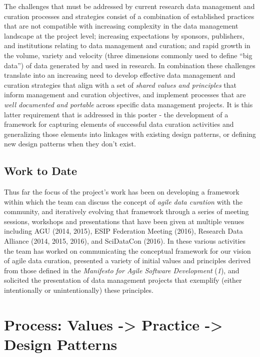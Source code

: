 \documentclass[final]{beamer}
\begin{document}
\begin{frame}[t]
\begin{multicols}{3}
The challenges that must be addressed by current research data
management and curation processes and strategies consist of a
combination of established practices that are not compatible with
increasing complexity in the data management landscape at the project
level; increasing expectations by sponsors, publishers, and institutions
relating to data management and curation; and rapid growth in the
volume, variety and velocity (three dimensions commonly used to define
``big data'') of data generated by and used in research. In combination
these challenges translate into an increasing need to develop effective
data management and curation strategies that align with a set of
\emph{shared values and principles} that inform management and curation
objectives, and implement processes that are \emph{well documented and
portable} across specific data management projects. It is this latter
requirement that is addressed in this poster - the development of a
framework for capturing elements of successful data curation activities
and generalizing those elements into linkages with existing design
patterns, or defining new design patterns when they don't exist.

\subsection{Work to Date}\label{work-to-date}

Thus far the focus of the project's work has been on developing a
framework within which the team can discuss the concept of \emph{agile
data curation} with the community, and iteratively evolving that
framework through a series of meeting sessions, workshops and
presentations that have been given at multiple venues including AGU
(2014, 2015), ESIP Federation Meeting (2016), Research Data Alliance
(2014, 2015, 2016), and SciDataCon (2016). In these various activities
the team has worked on communicating the conceptual framework for our
vision of agile data curation, presented a variety of initial values and
principles derived from those defined in the \emph{Manifesto for Agile
Software Development} (\emph{1}), and solicited the presentation of data
management projects that exemplify (either intentionally or
unintentionally) these principles.

\section{Process: Values -\textgreater{} Practice -\textgreater{} Design
Patterns}\label{process-values---practice---design-patterns}


\end{multicols}
\end{frame}
\end{document}

